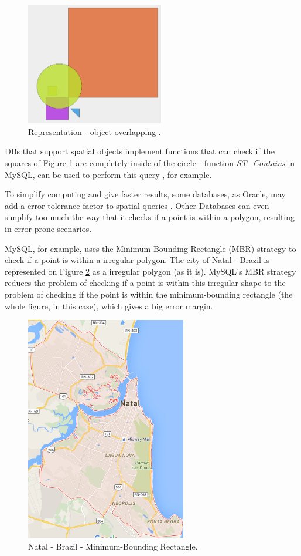 \begin{figure}[ht!]
\centering
\includegraphics[width=60mm]{Imagens/objectOverLap.png}
\caption{Representation - object overlapping \cite{mysqlspatial}. \label{fig:objectoverlap}}
\end{figure}

DBs that support spatial objects implement functions that can check if the squares of Figure \ref{fig:objectoverlap} are completely inside of the circle - function  \textit{ST\_Contains} in MySQL, can be used to perform this query \cite{mysqlspatial}, for example. 

To simplify computing and give faster results, some databases, as Oracle, may add a error tolerance factor to spatial queries \cite{oracletolerance}. Other Databases  can even simplify too much the way that it checks if a point is within a polygon, resulting in error-prone scenarios. 

MySQL, for example, uses the Minimum Bounding Rectangle (MBR) strategy to check if a point is within a irregular polygon. The city of Natal - Brazil is represented on Figure \ref{fig:natalmbr} as a irregular polygon (as it is). MySQL's MBR strategy reduces the problem of checking if a point is within this irregular shape to the problem of checking if the point is within the minimum-bounding rectangle (the whole figure, in this case), which gives a big error margin.

\begin{figure}[ht!]
\centering
\includegraphics[width=70mm]{Imagens/natal.png}
\caption{Natal - Brazil - Minimum-Bounding Rectangle. \label{fig:natalmbr}}
\end{figure}

